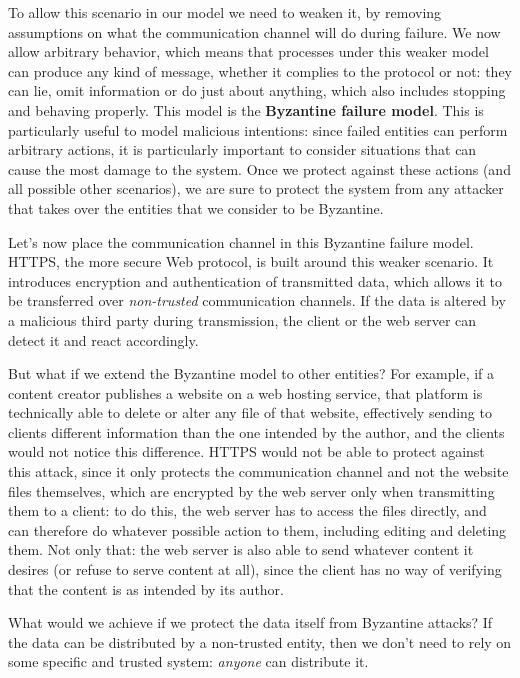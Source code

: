 \documentclass[mscthesis]{usiinfthesis}
\begin{document}
To allow this scenario in our model we need to weaken it, by removing assumptions on what the communication channel will do during failure. We now allow arbitrary behavior, which means that processes under this weaker model can produce any kind of message, whether it complies to the protocol or not: they can lie, omit information or do just about anything, which also includes stopping and behaving properly. This model is the \textbf{Byzantine failure model}.
This is particularly useful to model malicious intentions: since failed entities can perform arbitrary actions, it is particularly important to consider situations that can cause the most damage to the system. Once we protect against these actions (and all possible other scenarios), we are sure to protect the system from any attacker that takes over the entities that we consider to be Byzantine.

Let's now place the communication channel in this Byzantine failure model.
HTTPS, the more secure Web protocol, is built around this weaker scenario. It introduces encryption and authentication of transmitted data, which allows it to be transferred over \textit{non-trusted} communication channels.
If the data is altered by a malicious third party during transmission, the client or the web server can detect it and react accordingly.

But what if we extend the Byzantine model to other entities? For example, if a content creator publishes a website on a web hosting service, that platform is technically able to delete or alter any file of that website, effectively sending to clients different information than the one intended by the author, and the clients would not notice this difference. HTTPS would not be able to protect against this attack, since it only protects the communication channel and not the website files themselves, which are encrypted by the web server only when transmitting them to a client: to do this, the web server has to access the files directly, and can therefore do whatever possible action to them, including editing and deleting them. Not only that: the web server is also able to send whatever content it desires (or refuse to serve content at all), since the client has no way of verifying that the content is as intended by its author.

What would we achieve if we protect the data itself from Byzantine attacks? If the data can be distributed by a non-trusted entity, then we don't need to rely on some specific and trusted system: \textit{anyone} can distribute it.
\end{document}
